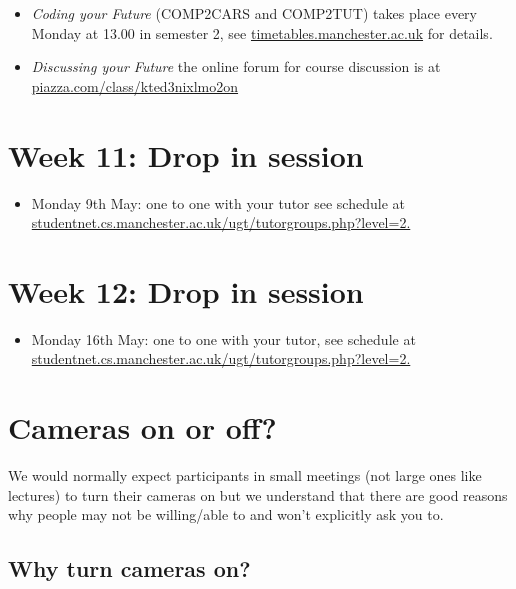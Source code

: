 \documentclass[
]{book}
\providecommand{\tightlist}{%
  \setlength{\itemsep}{0pt}\setlength{\parskip}{0pt}}
\begin{document}
\begin{itemize}
\tightlist
\item
  \emph{Coding your Future} (COMP2CARS and COMP2TUT) takes place every Monday at 13.00 in semester 2, see \href{https://timetables.manchester.ac.uk/}{timetables.manchester.ac.uk} for details.
\item
  \emph{Discussing your Future} the online forum for course discussion is at \href{https://piazza.com/class/kted3nixlmo2on}{piazza.com/class/kted3nixlmo2on}
\end{itemize}

\hypertarget{week11}{%
\section{Week 11: Drop in session}\label{week11}}

\begin{itemize}
\tightlist
\item
  Monday 9th May: one to one with your tutor see schedule at \href{https://studentnet.cs.manchester.ac.uk/ugt/tutorgroups.php?level=2.}{studentnet.cs.manchester.ac.uk/ugt/tutorgroups.php?level=2.}
\end{itemize}

\hypertarget{week12}{%
\section{Week 12: Drop in session}\label{week12}}

\begin{itemize}
\tightlist
\item
  Monday 16th May: one to one with your tutor, see schedule at \href{https://studentnet.cs.manchester.ac.uk/ugt/tutorgroups.php?level=2.}{studentnet.cs.manchester.ac.uk/ugt/tutorgroups.php?level=2.}
\end{itemize}

\hypertarget{cameras}{%
\section{Cameras on or off?}\label{cameras}}

We would normally expect participants in small meetings (not large ones like lectures) to turn their cameras on but we understand that there are good reasons why people may not be willing/able to and won't explicitly ask you to.

\hypertarget{why-turn-cameras-on}{%
\subsection{Why turn cameras on?}\label{why-turn-cameras-on}}
\end{document}
